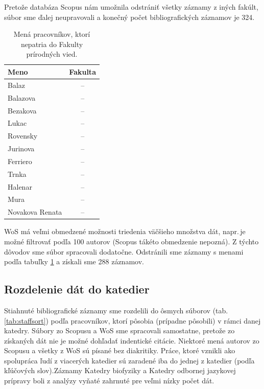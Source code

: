 Pretože databáza Scopus nám umožnila odstrániť všetky záznamy z iných fakúlt,
súbor  sme ďalej neupravovali a konečný počet
bibliografických záznamov je 324.

\begin{table}
\centering\small
\begin{tabular}{lc}
  \hline\noalign{\vspace{.3ex}}
  Meno            & Fakulta \\[0.3ex]
  \hline\noalign{\vspace{.5ex}}
  Balaz           & -- \\
  Balazova        & -- \\
  Bezakova        & -- \\
  Lukac           & -- \\
  Rovensky        & -- \\[1ex]
  Jurinova        & -- \\
  Ferriero        & -- \\
  Trnka           & -- \\
  Halenar         & -- \\
  Mura            & -- \\[1ex]
  Novakova Renata & -- \\[0.5ex]
  \hline
\end{tabular}
\caption{Mená pracovníkov, ktorí nepatria do Fakulty prírodných vied.}
\label{tab:wos.excludedstaff}
\end{table}

WoS má veľmi obmedzené možnosti triedenia väčšieho množstva dát, napr.\,je možné
filtrovať podľa 100 autorov (Scopus tákéto obmedzenie nepozná).  Z týchto
dôvodov sme súbor  spracovali dodatočne.
Odstránili sme záznamy s menami podľa tabuľky \ref{tab:wos.excludedstaff} a
získali sme 288 záznamov.


\subsection{Rozdelenie dát do katedier}

Stiahnuté bibliografické záznamy sme rozdelili do ôsmych súborov
(tab.\,\ref{tab:staffsort}) podľa pracovníkov, ktorí pôsobia (prípadne pôsobili)
v rámci danej katedry.  Súbory zo Scopusu a WoS sme spracovali samostatne,
pretože zo získaných dát nie je možné dohľadať indentické citácie.  Niektoré
mená autorov zo Scopusu a všetky z WoS sú písané bez diakritiky.  Práce, ktoré
vznikli ako spolupráca ľudí z viacerých katedier sú zaradené iba do jednej z
katedier (podľa kľúčových slov).Záznamy Katedry biofyziky a Katedry odbornej
jazykovej prípravy boli z analýzy vyňaté zahrnuté pre veľmi nízky počet dát.

